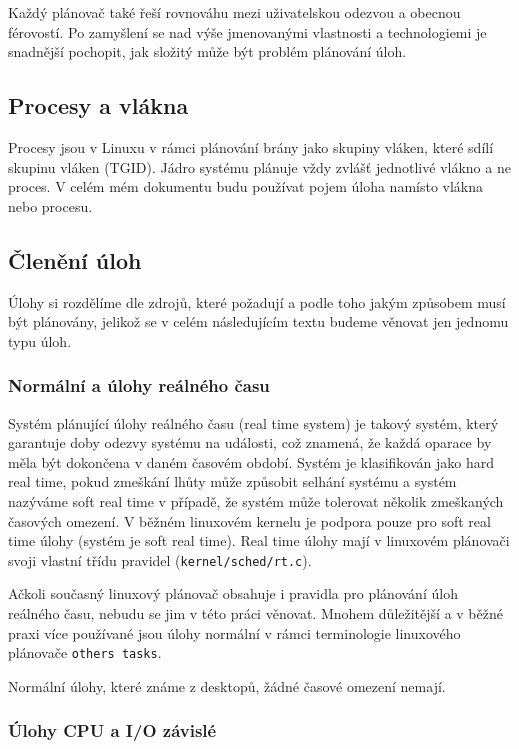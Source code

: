 \documentclass[
  field=ainfk,
  biblatex,
  glossaries,
  index
]{kidiplom}
\begin{document}
Každý plánovač také řeší rovnováhu mezi uživatelskou odezvou a obecnou férovostí. Po zamyšlení se nad výše jmenovanými vlastnosti a technologiemi je snadnější pochopit, jak složitý může být problém plánování úloh.

\subsection{Procesy a vlákna}
Procesy jsou v Linuxu v rámci plánování brány jako skupiny vláken, které sdílí skupinu vláken (TGID). Jádro systému plánuje vždy zvlášť jednotlivé vlákno a ne proces. V celém mém dokumentu budu používat pojem úloha namísto vlákna nebo procesu.

\subsection{Členění úloh}
Úlohy si rozdělíme dle zdrojů, které požadují a podle toho jakým způsobem musí být plánovány, jelikož se v celém 
následujícím textu budeme věnovat jen jednomu typu úloh.

\subsubsection{Normální a úlohy reálného času}

Systém plánující úlohy reálného času (real time system) je takový systém, který garantuje doby odezvy systému na události, což znamená, že každá oparace by měla být dokončena v daném časovém období. Systém je klasifikován jako hard real time, pokud zmeškání lhůty může způsobit selhání systému a systém nazýváme soft real time v případě, že systém může tolerovat několik zmeškaných časových omezení. V běžném linuxovém kernelu je podpora pouze pro soft real time úlohy (systém je soft real time). Real time úlohy mají v linuxovém plánovači svoji vlastní třídu pravidel (\verb#kernel/sched/rt.c#).

Ačkoli současný linuxový plánovač obsahuje i pravidla pro plánování úloh reálného času, nebudu se jim v této práci věnovat. Mnohem důležitější a v běžné praxi více používané jsou úlohy normální v rámci terminologie linuxového plánovače \verb#others tasks#.

Normální úlohy, které známe z desktopů, žádné časové omezení nemají.

\subsubsection{Úlohy CPU a I/O závislé}
\end{document}
